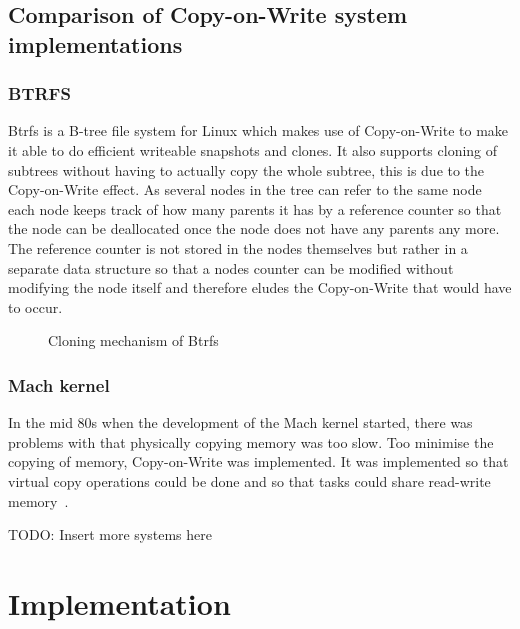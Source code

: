 \documentclass[a4paper,12pt]{article}
\begin{document}
\subsection{Comparison of Copy-on-Write system implementations}
\subsubsection{BTRFS}
Btrfs is a B-tree file system for Linux which makes use of Copy-on-Write to make it able to do efficient writeable 
snapshots and clones. It also supports cloning of subtrees without having to actually copy the whole subtree, 
this is due to the Copy-on-Write effect. As several nodes in the tree can refer to the same node each node keeps 
track of how many parents it has by a reference counter so that the node can be deallocated once the node does not 
have any parents any more. The reference counter is not stored in the nodes themselves but rather in a separate data 
structure so that a nodes counter can be modified without modifying the node itself and therefore eludes the 
Copy-on-Write that would have to occur.

\begin{figure}[htp] 
    \caption{Cloning mechanism of Btrfs~\cite{BTRFS}}
    \label{fig:btrfs_tree}
\end{figure}

\subsubsection{Mach kernel}
In the mid 80s when the development of the Mach kernel started, there was problems with that physically copying memory 
was too slow. Too minimise the copying of memory, Copy-on-Write was implemented. It was implemented so that virtual 
copy operations could be done and so that tasks could share read-write memory~\cite{MACH}.


TODO: Insert more systems here
\section{Implementation}
\end{document}
